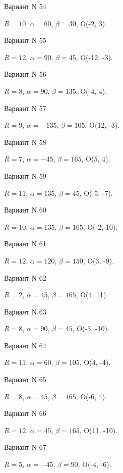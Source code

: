 \documentclass[11pt]{report}
\begin{document}
Вариант N 54

$R = 10$, $\alpha = 60$, $\beta = 30$, O(-2, 3).



Вариант N 55

$R = 12$, $\alpha = 90$, $\beta = 45$, O(-12, -3).



Вариант N 56

$R = 8$, $\alpha = 90$, $\beta = 135$, O(-4, 4).



Вариант N 57

$R = 9$, $\alpha = -135$, $\beta = 105$, O(12, -3).



Вариант N 58

$R = 7$, $\alpha = -45$, $\beta = 165$, O(5, 4).



Вариант N 59

$R = 11$, $\alpha = 135$, $\beta = 45$, O(-5, -7).



Вариант N 60

$R = 10$, $\alpha = 135$, $\beta = 165$, O(-2, 10).



Вариант N 61

$R = 12$, $\alpha = 120$, $\beta = 150$, O(3, -9).



Вариант N 62

$R = 2$, $\alpha = 45$, $\beta = 165$, O(4, 11).



Вариант N 63

$R = 8$, $\alpha = 90$, $\beta = 45$, O(-3, -10).



Вариант N 64

$R = 11$, $\alpha = 60$, $\beta = 105$, O(4, -4).



Вариант N 65

$R = 8$, $\alpha = 45$, $\beta = 165$, O(-6, 4).



Вариант N 66

$R = 12$, $\alpha = 45$, $\beta = 165$, O(11, -10).



Вариант N 67

$R = 5$, $\alpha = -45$, $\beta = 90$, O(-4, -6).
\end{document}
